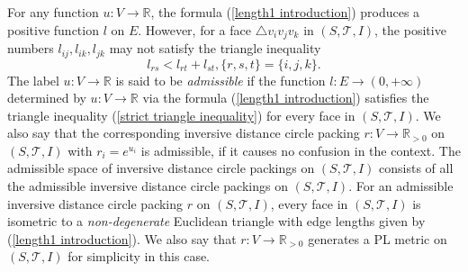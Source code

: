 \documentclass[12pt]{amsart}
\begin{document}
For any function $u: V\rightarrow \mathbb{R}$, the formula (\ref{length1 introduction})
produces a positive function $l$ on $E$.
However, for a face $\triangle v_iv_jv_k$ in $(S, \mathcal{T}, I)$, the positive numbers $l_{ij}, l_{ik}, l_{jk}$ may not satisfy
the triangle inequality
\begin{equation}\label{strict triangle inequality}
l_{rs}< l_{rt}+l_{st}, \{r,s,t\}=\{i,j,k\}.
\end{equation}
The label $u: V\rightarrow \mathbb{R}$ is said to be \textit{admissible}
if the function $l: E\rightarrow (0, +\infty)$ determined by $u: V\rightarrow \mathbb{R}$
via the formula (\ref{length1 introduction}) satisfies
the triangle inequality (\ref{strict triangle inequality}) for every face in $(S, \mathcal{T}, I)$.
We also say that the corresponding inversive distance circle packing $r:V\rightarrow \mathbb{R}_{>0}$
on $(S, \mathcal{T}, I)$ with $r_i=e^{u_i}$ is admissible, if it causes no confusion in the context.
The admissible space of inversive distance circle packings on $(S, \mathcal{T}, I)$ consists of all the admissible inversive distance circle packings on
$(S, \mathcal{T}, I)$.
For an admissible inversive distance circle packing $r$ on $(S, \mathcal{T}, I)$, every face in $(S, \mathcal{T}, I)$ is isometric to a \textit{non-degenerate} Euclidean triangle
with edge lengths given by (\ref{length1 introduction}).
We also say that $r: V\rightarrow \mathbb{R}_{>0}$ generates a PL metric on $(S, \mathcal{T}, I)$ for simplicity in this case.
\end{document}
